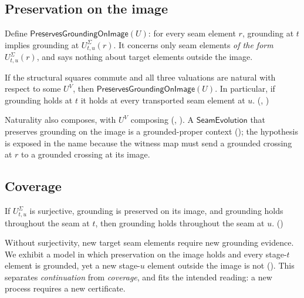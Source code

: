 \subsection{Preservation on the image}
Define $\mathsf{PreservesGroundingOnImage}(U)$: for every seam element $r$, grounding at $t$ implies grounding at $U^\Sigma_{t,u}(r)$. It concerns only seam elements \emph{of the form} $U^\Sigma_{t,u}(r)$, and says nothing about target elements outside the image.
\begin{theorem}\label{thm:preserve}
If the structural squares commute and all three valuations are natural with respect to some $U^V$, then $\mathsf{PreservesGroundingOnImage}(U)$. In particular, if grounding holds at $t$ it holds at every transported seam element at $u$. (, )
\end{theorem}
Naturality also composes, with $U^V$ composing (, ). A $\mathsf{SeamEvolution}$ that preserves grounding on the image is a grounded-proper context (); the hypothesis is exposed in the name because the witness map must send a grounded crossing at $r$ to a grounded crossing at its image.

\subsection{Coverage}
\begin{theorem}\label{thm:coverage}
If $U^\Sigma_{t,u}$ is surjective, grounding is preserved on its image, and grounding holds throughout the seam at $t$, then grounding holds throughout the seam at $u$. ()
\end{theorem}
Without surjectivity, new target seam elements require new grounding evidence. We exhibit a model in which preservation on the image holds and every stage-$t$ element is grounded, yet a new stage-$u$ element outside the image is not (). This separates \emph{continuation} from \emph{coverage}, and fits the intended reading: a new process requires a new certificate.

